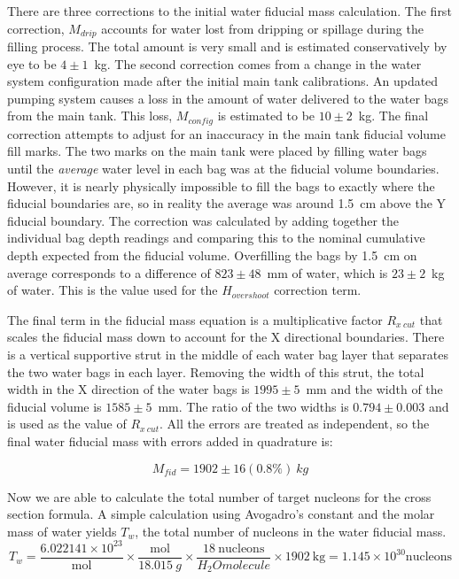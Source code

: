 There are three corrections to the initial water fiducial mass calculation. The first correction, $M_{drip}$ accounts for water lost from dripping or spillage during the filling process. The total amount is very small and is estimated conservatively by eye to be $4\pm1$~kg. The second correction comes from a change in the water system configuration made after the initial main tank calibrations. An updated pumping system causes a loss in the amount of water delivered to the water bags from the main tank. This loss, $M_{config}$ is estimated to be $10\pm2$~kg. The final correction attempts to adjust for an inaccuracy in the main tank fiducial volume fill marks. The two marks on the main tank were placed by filling water bags until the \emph{average} water level in each bag was at the fiducial volume boundaries. However, it is nearly physically impossible to fill the bags to exactly where the fiducial boundaries are, so in reality the average was around 1.5~cm above the Y fiducial boundary. The correction was calculated by adding together the individual bag depth readings and comparing this to the nominal cumulative depth expected from the fiducial volume. Overfilling the bags by 1.5~cm on average corresponds to a difference of $823\pm48$~mm of water, which is $23\pm2$~kg of water. This is the value used for the $H_{overshoot}$ correction term. 

The final term in the fiducial mass equation is a multiplicative factor $R_{x~cut}$ that scales the fiducial mass down to account for the X directional boundaries. There is a vertical supportive strut in the middle of each water bag layer that separates the two water bags in each layer. Removing the width of this strut, the total width in the X direction of the water bags is $1995\pm5$~mm and the width of the fiducial volume is $1585\pm5$~mm. The ratio of the two widths is $0.794\pm0.003$ and is used as the value of $R_{x~cut}$. All the errors are treated as independent, so the final water fiducial mass with errors added in quadrature is:

\begin{equation}
M_{fid} = 1902 \pm 16 (0.8\%)~kg
\end{equation}

Now we are able to calculate the total number of target nucleons for the cross section formula. A simple calculation using Avogadro's constant and the molar mass of water yields $T_w$, the total number of nucleons in the water fiducial mass.
\begin{equation}
\label{eqn:tarnum}
T_w = \frac{6.022141\times10^{23}}{\text{mol}}\times \frac{\text{mol}}{18.015~g} \times \frac{18~\text{nucleons}}{H_2 O molecule} \times 1902~\text{kg} = 1.145 \times 10^{30} \text{nucleons}
\end{equation}
